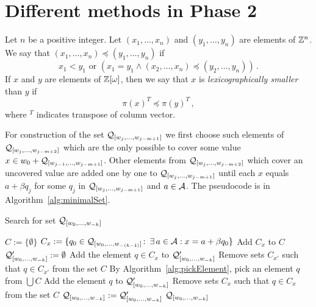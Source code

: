 \section{Different methods in Phase 2}
\label{sec:methodsTwo}


\begin{defn}
\label{def:lexicographical}
Let $n$ be a positive integer. Let $(x_1, \dots, x_n)$ and $(y_1, \dots, y_n)$ are elements of $\mathbb{Z}^n$. We say that $(x_1, \dots, x_n)\preceq (y_1, \dots, y_n)$ if 
$$
x_1<y_1 \text{ or } \left(x_1=y_1 \wedge (x_2, \dots, x_n)\preceq (y_2, \dots, y_n)\right)\,.
$$
If $x$ and $y$ are elements of $\mathbb{Z}[\omega]$, then we say that $x$ is \emph{lexicographically smaller} than $y$ if
$$
\pi(x)^T \preceq \pi(y)^T\,,
$$
where $^T$ indicates transpose of column vector.
\end{defn}


\begin{upravit}
For construction of the set $\mathcal{Q}_{[w_j,\dots, w_{j-m+1}]}$ we first choose such elements of $\mathcal{Q}_{[w_j,\dots, w_{j-m+2}]}$ which are the only possible to cover some value $x \in w_0 + \mathcal{Q}_{[w_{j-1},\dots, w_{j-m+1}]}$. Other elements from $\mathcal{Q}_{[w_j,\dots, w_{j-m+2}]}$ which cover an uncovered value are added one by one to $\mathcal{Q}_{[w_j,\dots, w_{j-m+1}]}$ until each $x$ equals $a+\beta q_j$ for some $q_j$ in $\mathcal{Q}_{[w_j,\dots, w_{j-m+1}]}$ and $a\in\mathcal{A}$. The pseudocode is in Algorithm~\ref{alg:minimalSet}. 
\end{upravit}

\begin{algorithm}
  \caption{Search for set $\mathcal{Q}_{[w_{0}, \dots, w_{-k}]}$ }
    \label{alg:minimalSet}
  \begin{algorithmic}[1]
    \STATE $C:=\{\emptyset\}$
    	\STATE $C_x:= \{q_0\in\mathcal{Q}_{[w_{0}, \dots, w_{-(k-1)}]}\colon\, \exists \, a\in\mathcal{A}: x=a+\beta q_0 \}$
        \STATE Add $C_x$ to $C$
    \ENDFOR
    \STATE $\mathcal{Q}_{[w_{0}, \dots, w_{-k}]}':=\emptyset$
    		\STATE Add the element $q\in C_x$ to $\mathcal{Q}_{[w_{0}, \dots, w_{-k}]}'$
	        \STATE Remove sets $C_{x'}$ such that $q \in C_{x'}$  from the set $C$ 
	    \ENDIF
	\ENDFOR
        \STATE By Algorithm~\ref{alg:pickElement},  pick an element $q$ from $\bigcup C$
        \STATE Add the element $q$ to $\mathcal{Q}_{[w_{0}, \dots, w_{-k}]}'$
        \STATE Remove sets $C_x$ such that $q \in C_x$  from the set $C$ 
    \ENDWHILE
	\STATE $\mathcal{Q}_{[w_{0}, \dots, w_{-k}]}:=\mathcal{Q}_{[w_{0}, \dots, w_{-k}]}'$
    \RETURN $\mathcal{Q}_{[w_{0}, \dots, w_{-k}]}$
  \end{algorithmic}
\end{algorithm}


